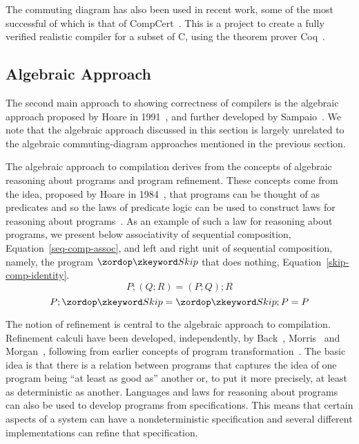 \documentclass[a4paper,10pt]{report}
\begin{document}
The commuting diagram has also been used in recent work, some of the most
successful of which is that of CompCert~\cite{leroy2009a, leroy2009b,
  leroy2012}.  This is a project to create a fully verified realistic compiler
for a subset of C, using the theorem prover Coq~\cite{coq2004}.

\subsection{Algebraic Approach}
\label{algebraic-approach-subsection}

The second main approach to showing correctness of compilers is the
algebraic approach proposed by Hoare in 1991~\cite{hoare1991}, and
further developed by Sampaio~\cite{hoare1993, sampaio1993,
  sampaio1997}. We note that the algebraic approach discussed in this
section is largely unrelated to the algebraic commuting-diagram
approaches mentioned in the previous section.

The algebraic approach to compilation derives from the concepts of algebraic
reasoning about programs and program refinement. These concepts come from the
idea, proposed by Hoare in 1984~\cite{hoare1984}, that programs can be thought
of as predicates and so the laws of predicate logic can be used to construct
laws for reasoning about programs~\cite{hoare1987}. As an example of such a law
for reasoning about programs, we present below associativity of sequential
composition, Equation~\eqref{seq-comp-assoc}, and left and right unit of
sequential composition, namely, the program $\Skip$ that does nothing,
Equation~\eqref{skip-comp-identity}.
\begin{equation}
  \label{seq-comp-assoc}
  P;(Q;R) = (P;Q);R
\end{equation}
\begin{equation}
  \label{skip-comp-identity}
  P;\Skip = \Skip;P = P
\end{equation}

The notion of refinement is central to the algebraic approach to compilation.
Refinement calculi have been developed, independently, by Back~\cite{back1981},
Morris~\cite{morris1987} and Morgan~\cite{morgan1990}, following from earlier
concepts of program transformation~\cite{bauer1976, balzer1976, standish1976,
  arsac1979}.  The basic idea is that there is a relation between programs that
captures the idea of one program being ``at least as good as'' another or, to
put it more precisely, at least as deterministic as another.  Languages and laws
for reasoning about programs can also be used to develop programs from
specifications.  This means that certain aspects of a system can have a
nondeterministic specification and several different implementations can refine
that specification.
\end{document}
